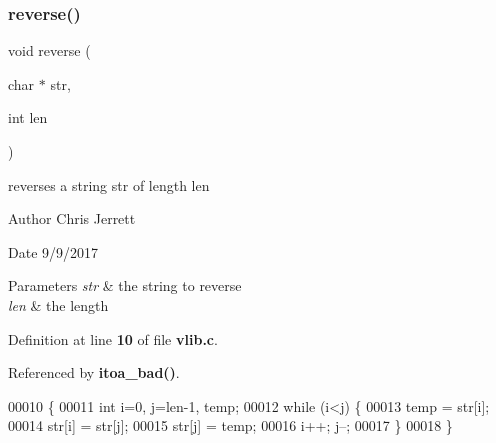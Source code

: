 \subsubsection{reverse()}
{\footnotesize\ttfamily void reverse (\begin{DoxyParamCaption}\item[{char $\ast$}]{str,  }\item[{int}]{len }\end{DoxyParamCaption})}



reverses a string \textquotesingle{}str\textquotesingle{} of length \textquotesingle{}len\textquotesingle{} 

\begin{DoxyAuthor}{Author}
Chris Jerrett 
\end{DoxyAuthor}
\begin{DoxyDate}{Date}
9/9/2017 
\end{DoxyDate}

\begin{DoxyParams}{Parameters}
{\em str} & the string to reverse \\
\hline
{\em len} & the length \\
\hline
\end{DoxyParams}


Definition at line \textbf{ 10} of file \textbf{ vlib.\+c}.



Referenced by \textbf{ itoa\+\_\+bad()}.


\begin{DoxyCode}
00010                                  \{
00011     \textcolor{keywordtype}{int} i=0, j=len-1, temp;
00012     \textcolor{keywordflow}{while} (i<j) \{
00013         temp = str[i];
00014         str[i] = str[j];
00015         str[j] = temp;
00016         i++; j--;
00017     \}
00018 \}
\end{DoxyCode}
